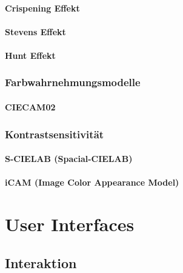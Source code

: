 \documentclass[a4paper, 11pt, accentcolor = tud3b]{tudreport}
\begin{document}
				\subsubsection{Crispening Effekt} %

				\subsubsection{Stevens Effekt} %

				\subsubsection{Hunt Effekt} %

			\subsection{Farbwahrnehmungsmodelle} %

				\subsubsection{CIECAM02} %

			\subsection{Kontrastsensitivität} %

				\subsubsection{S-CIELAB (Spacial-CIELAB)} %

				\subsubsection{iCAM (Image Color Appearance Model)} %

	\chapter{User Interfaces} %

		\section{Interaktion} %
\end{document}
